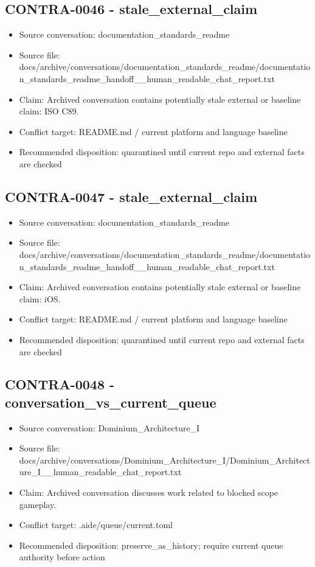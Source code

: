 \documentclass[11pt,a4paper]{report}
\begin{document}
\subsection{CONTRA-0046 - stale\_external\_claim}

\begin{itemize}
\item Source conversation: documentation\_standards\_readme
\item Source file: docs/archive/conversations/documentation\_standards\_readme/documentation\_standards\_readme\_handoff\_\_human\_readable\_chat\_report.txt
\item Claim: Archived conversation contains potentially stale external or baseline claim: ISO C89.
\item Conflict target: README.md / current platform and language baseline
\item Recommended disposition: quarantined until current repo and external facts are checked
\end{itemize}

\subsection{CONTRA-0047 - stale\_external\_claim}

\begin{itemize}
\item Source conversation: documentation\_standards\_readme
\item Source file: docs/archive/conversations/documentation\_standards\_readme/documentation\_standards\_readme\_handoff\_\_human\_readable\_chat\_report.txt
\item Claim: Archived conversation contains potentially stale external or baseline claim: iOS.
\item Conflict target: README.md / current platform and language baseline
\item Recommended disposition: quarantined until current repo and external facts are checked
\end{itemize}

\subsection{CONTRA-0048 - conversation\_vs\_current\_queue}

\begin{itemize}
\item Source conversation: Dominium\_Architecture\_I
\item Source file: docs/archive/conversations/Dominium\_Architecture\_I/Dominium\_Architecture\_I\_\_human\_readable\_chat\_report.txt
\item Claim: Archived conversation discusses work related to blocked scope gameplay.
\item Conflict target: .aide/queue/current.toml
\item Recommended disposition: preserve\_as\_history; require current queue authority before action
\end{itemize}
\end{document}
